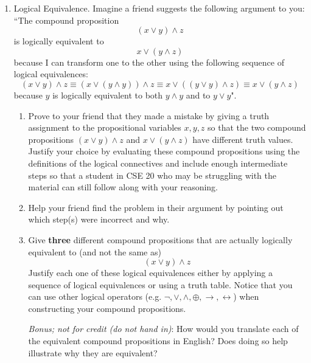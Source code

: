 \begin{enumerate}[labelindent=0pt, leftmargin=0pt]
\begin{enumerate}
        \end{enumerate}

        \item Logical Equivalence. Imagine a friend suggests the following argument to you: ``The compound proposition
        \[
        (x \lor y) \land z
        \]
        is logically equivalent to 
        \[
        x \lor (y \land z)
        \]
        because I can transform one to the other using the following sequence of logical equivalences: 
        \[
           (x \lor y) \land z \equiv
           (x \lor (y \land y)) \land z \equiv
           x \lor ( (y \lor y) \land z) \equiv x \lor (y \land z) 
        \]
        because $y$ is logically equivalent to both $y \land y$ and to $y \lor y$".
        
        \begin{enumerate}
        \item Prove to your friend that they made a mistake by giving a truth
        assignment to the propositional variables $x,y,z$ so that 
        the two compound propositions 
        $ (x \lor y) \land z$ and $ x \lor (y \land z)$ have different truth values.
        Justify your choice by evaluating these compound propositions using the definitions of the logical connectives 
        and include enough intermediate steps so that a student in CSE 20 who may be 
        struggling with the material can still follow along with your reasoning.
        
        \item
        Help your friend find the problem in their argument by pointing out which step(s) were incorrect and why.
        
        \item Give {\bf three} different compound propositions
        that are actually logically equivalent to (and not the same as)
        \[
            (x \lor y) \land z
        \]
        Justify each one of these logical equivalences either by applying a sequence of logical equivalences
        or using a truth table.  Notice that you can use other logical operators (e.g. $\lnot, \lor, \land, \oplus, \to, 
        \leftrightarrow$) 
        when constructing your compound propositions.
     
        {\it Bonus; not for credit (do not hand in)}: How would you translate each of the equivalent compound
        propositions in English? Does doing so help illustrate why they are equivalent?
        \end{enumerate}
        

\end{enumerate}
